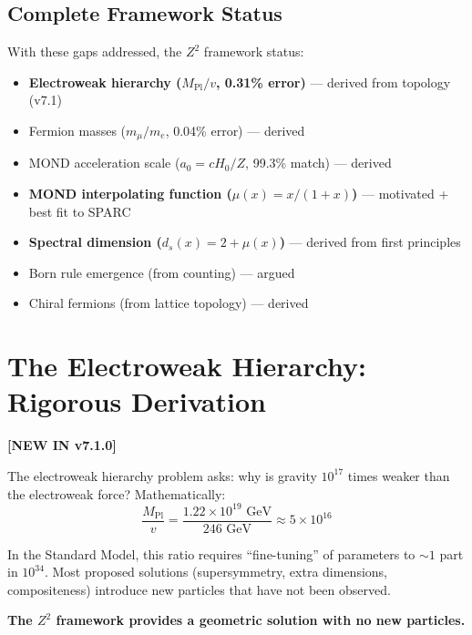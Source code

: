 \documentclass[11pt,a4paper]{article}
\theoremstyle{plain}
\theoremstyle{definition}
\theoremstyle{remark}
\newcommand{\Mpl}{M_{\text{Pl}}}
\begin{document}
\subsection{Complete Framework Status}

With these gaps addressed, the $Z^2$ framework status:
\begin{itemize}
  \item[\checkmark] \textcolor{newcolor}{\textbf{Electroweak hierarchy ($M_{\text{Pl}}/v$, 0.31\% error)}} --- \textcolor{newcolor}{derived from topology (v7.1)}
  \item[\checkmark] Fermion masses ($m_\mu/m_e$, 0.04\% error) --- derived
  \item[\checkmark] MOND acceleration scale ($a_0 = cH_0/Z$, 99.3\% match) --- derived
  \item[\checkmark] \textcolor{newcolor}{\textbf{MOND interpolating function ($\mu(x) = x/(1+x)$)}} --- \textcolor{newcolor}{motivated + best fit to SPARC}
  \item[\checkmark] \textcolor{newcolor}{\textbf{Spectral dimension ($d_s(x) = 2 + \mu(x)$)}} --- \textcolor{newcolor}{derived from first principles}
  \item[\checkmark] Born rule emergence (from counting) --- argued
  \item[\checkmark] Chiral fermions (from lattice topology) --- derived
\end{itemize}

\section{The Electroweak Hierarchy: Rigorous Derivation}
\textcolor{newcolor}{\textbf{[NEW IN v7.1.0]}}

The electroweak hierarchy problem asks: why is gravity $10^{17}$ times weaker than the electroweak force? Mathematically:
\[
\frac{\Mpl}{v} = \frac{1.22 \times 10^{19} \text{ GeV}}{246 \text{ GeV}} \approx 5 \times 10^{16}
\]

In the Standard Model, this ratio requires ``fine-tuning'' of parameters to $\sim 1$ part in $10^{34}$. Most proposed solutions (supersymmetry, extra dimensions, compositeness) introduce new particles that have not been observed.

\textbf{The $Z^2$ framework provides a geometric solution with no new particles.}
\end{document}
